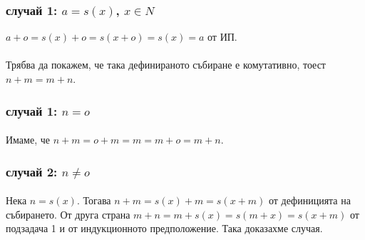 \documentclass[12pt]{article}
\begin{document}
\subsubsection*{случай 1: $a = s(x)$, $x \in N$}
$a + o = s(x) + o = s(x + o) = s(x) = a$ от ИП.

\paragraph*{}
Трябва да покажем, че така дефинираното събиране е комутативно, тоест $n+m=m+n$.
\subsubsection*{случай 1: $n=o$}
\paragraph*{}
Имаме, че $n+m = o+m = m = m + o = m + n$.
\subsubsection*{случай 2: $n \neq o$}
\paragraph*{}
Нека $n = s(x)$. Тогава $n+m = s(x) + m = s(x+m)$ от дефиницията на събирането. От друга страна $m+n = m + s(x) = s(m+x) = s(x+m)$ от подзадача 1 и от индукционното предположение. Така доказахме случая. 
\end{document}
